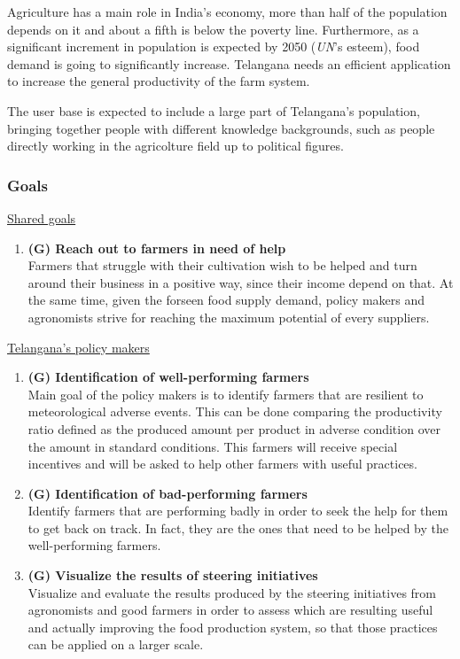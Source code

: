 \documentclass[table, 12pt]{article}
\begin{document}
Agriculture has a main role in India's economy, more than half of the population depends on it and about a fifth is below the poverty line.
Furthermore, as a significant increment in population is expected by 2050 (\emph{UN}'s esteem), food demand is going to significantly increase.
Telangana needs an efficient application to increase the general productivity of the farm system.

The user base is expected to include a large part of Telangana's population, bringing together people with different knowledge backgrounds, such as people directly working in the agricolture field up to political figures.

\subsubsection{Goals}
\underline{Shared goals}
\begin{enumerate}
    \item  \textbf{(G) Reach out to farmers in need of help} \\ Farmers that struggle with their cultivation wish to be helped and turn around their business in a positive way, since their income depend on that. At the same time, given the forseen food supply demand, policy makers and agronomists strive for reaching the maximum potential of every suppliers.
\end{enumerate}
\underline{Telangana's policy makers}
\begin{enumerate}
    \item \textbf{(G) Identification of well-performing farmers}\\
    Main goal of the policy makers is to identify farmers that are resilient to meteorological adverse events.
    This can be done comparing the productivity ratio defined as the produced amount per product in adverse condition over the amount in standard conditions.
    This farmers will receive special incentives and will be asked to help other farmers 
    with useful practices.
    \item \textbf{(G) Identification of bad-performing farmers}\\
    Identify farmers that are performing badly in order to seek the help for them to get back on track. In fact, they are the ones that need to be helped by the well-performing farmers.
    \item \textbf{(G) Visualize the results of steering initiatives}\\
    Visualize and evaluate the results produced by the steering initiatives from agronomists and good farmers in order to assess which are resulting useful and actually improving the food production system, so that those practices can be applied on a larger scale.
\end{enumerate}
\end{document}
